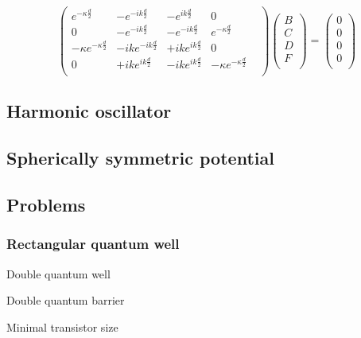 		\begin{equation}
			\begin{pmatrix}
			e^{-\kappa\frac{d}{2}}			&	-e^{-ik\frac{d}{2}}	&	-e^{ik\frac{d}{2}}	&	0 \\ 
			0	&	-e^{-ik\frac{d}{2}}	&	-e^{-ik\frac{d}{2}}	&	e^{-\kappa \frac{d}{2}} \\
			-\kappa e^{-\kappa \frac{d}{2}}	& -ike^{-ik\frac{d}{2}}	& +ike^{ik\frac{d}{2}}	& 0 \\
			0	& +ike^{ik\frac{d}{2}}	& -ike^{ik\frac{d}{2}}	& 	-\kappa e^{-\kappa\frac{d}{2}}	& \\
			\end{pmatrix}
			\begin{pmatrix}
			B \\
			C \\
			D \\
			F \\
			\end{pmatrix}
			=
			\begin{pmatrix}
			0 \\
			0 \\
			0 \\
			0 \\
			\end{pmatrix}			
		\end{equation}
	\subsection{Harmonic oscillator}
	\subsection{Spherically symmetric potential}
	\subsection{Problems}
		\subsubsection{Rectangular quantum well}
			Double quantum well
			
			Double quantum barrier
			
			Minimal transistor size
			
			